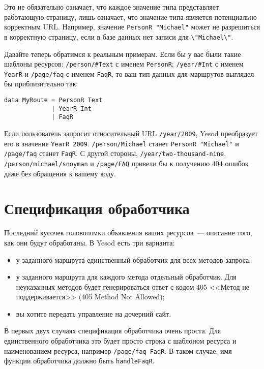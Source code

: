 \begin{remark}
Это не обязательно означает, что каждое значение типа представляет
работающую страницу, лишь означает, что значение типа является потенциально
корректным URL. Например, значение \lstinline!PersonR "Michael"! может
не разрешиться в корректную страницу, если в базе данных нет записи для
\lstinline!\"Michael\"!.
\end{remark}

Давайте теперь обратимся к реальным примерам. Если бы у вас были такие
шаблоны ресурсов: \lstinline!/person/#Text! с именем
\lstinline!PersonR!; \lstinline!/year/#Int! с именем
\lstinline!YearR! и \lstinline!/page/faq! с именем \lstinline!FaqR!,
то ваш тип данных для маршрутов выглядел бы приблизительно так:
\begin{lstlisting}
data MyRoute = PersonR Text
             | YearR Int
             | FaqR
\end{lstlisting}

Если пользователь запросит относительный URL \lstinline!/year/2009!,
Yesod преобразует его в значение \lstinline!YearR 2009!.
\lstinline!/person/Michael! станет \lstinline!PersonR "Michael"!
и \lstinline!/page/faq! станет \lstinline!FaqR!. С другой
стороны, \lstinline!/year/two-thousand-nine!,
\lstinline!/person/michael/snoyman! и \lstinline!/page/FAQ! привели бы
к получению 404 ошибок даже без обращения к вашему коду.

\section{Спецификация обработчика}
Последний кусочек головоломки объявления ваших ресурсов~--- описание
того, как они будут обработаны. В Yesod есть три варианта:
\begin{itemize}
\item у заданного маршрута единственный обработчик для всех методов запроса;
\item у заданного маршрута для каждого метода отдельный
  обработчик. Для неуказанных методов будет генерироваться ответ с
  кодом 405 <<Метод не поддерживается>> (405 Method Not
  Allowed);
\item вы хотите передать управление на дочерний сайт.
\end{itemize}

В первых двух случаях спецификация обработчика очень проста. Для
единственного обработчика это будет просто строка с шаблоном ресурса и
наименованием ресурса, например \lstinline!/page/faq FaqR!. В таком
случае, имя функции обработчика должно быть \lstinline!handleFaqR!.

